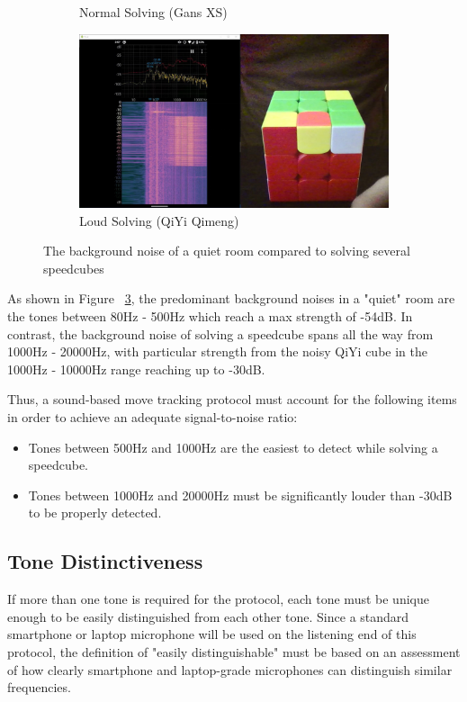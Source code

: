 \begin{figure}
\begin{subfigure}{.50\textwidth}
        \caption{Normal Solving (Gans XS)}
        \label{fig:signal-to-noise-ratio-xs}
    \end{subfigure}%
    \begin{subfigure}{.50\textwidth}
        \centering
        \includegraphics[width=.90\linewidth]{Figures/4 Protocol Design/Signal to Noise Ratio/qiyi_background_noise.jpg}
        \caption{Loud Solving (QiYi Qimeng)}
        \label{fig:signal-to-noise-ratio-qiyi}
    \end{subfigure}%
    \caption{The background noise of a quiet room compared to solving several speedcubes}
    \label{fig:signal-to-noise-ratio}
\end{figure}

As shown in Figure ~\ref{fig:signal-to-noise-ratio}, the predominant background noises in a "quiet" room are the tones between 80Hz - 500Hz which reach a max strength of -54dB.
In contrast, the background noise of solving a speedcube spans all the way from 1000Hz - 20000Hz, with particular strength from the noisy QiYi cube in the 1000Hz - 10000Hz range reaching up to -30dB.

Thus, a sound-based move tracking protocol must account for the following items in order to achieve an adequate signal-to-noise ratio:
\begin{itemize}
    \item Tones between 500Hz and 1000Hz are the easiest to detect while solving a speedcube.
    \item Tones between 1000Hz and 20000Hz must be significantly louder than -30dB to be properly detected.
\end{itemize}

\subsection{Tone Distinctiveness}
\label{subsec:tone-distinctiveness}
If more than one tone is required for the protocol, each tone must be unique enough to be easily distinguished from each other tone.
Since a standard smartphone or laptop microphone will be used on the listening end of this protocol, the definition of "easily distinguishable" must be based on an assessment of how clearly smartphone and laptop-grade microphones can distinguish similar frequencies.


